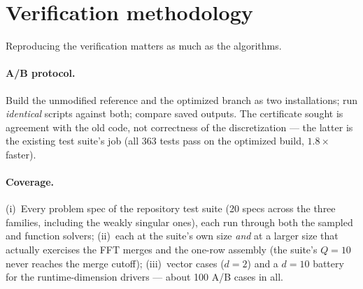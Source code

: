 \documentclass[11pt]{article}
\begin{document}
\section{Verification methodology}
\label{sec:verification}

Reproducing the verification matters as much as the algorithms.

\paragraph{A/B protocol.} Build the unmodified reference and the
optimized branch as two installations; run \emph{identical} scripts
against both; compare saved outputs. The certificate sought is
agreement with the old code, not correctness of the discretization ---
the latter is the existing test suite's job (all 363 tests pass on the
optimized build, $1.8\times$ faster).

\paragraph{Coverage.} (i)~Every problem spec of the repository test
suite (20 specs across the three families, including the weakly
singular ones), each run through both the sampled and function
solvers; (ii)~each at the suite's own size \emph{and} at a larger size
that actually exercises the FFT merges and the one-row assembly (the
suite's $Q=10$ never reaches the merge cutoff); (iii)~vector cases
($d=2$) and a $d=10$ battery for the runtime-dimension drivers ---
about 100 A/B cases in all.
\end{document}
